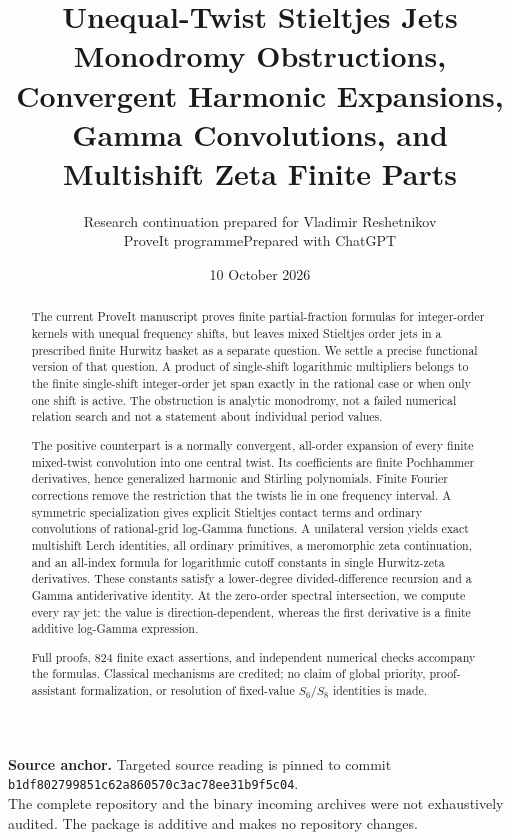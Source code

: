 \documentclass[11pt,a4paper]{article}
\title{\textbf{Unequal-Twist Stieltjes Jets}\\[5pt]
\large Monodromy Obstructions, Convergent Harmonic Expansions,\\
Gamma Convolutions, and Multishift Zeta Finite Parts}
\author{Research continuation prepared for Vladimir Reshetnikov\\
\small ProveIt programme\quad\textbullet\quad Prepared with ChatGPT}
\date{10 October 2026}
\numberwithin{equation}{section}
\theoremstyle{definition}\newtheorem{definition}[theorem]{Definition}
\theoremstyle{remark}\newtheorem{remark}[theorem]{Remark}
\newcommand{\pin}{\texttt{b1df802799851c62a860570c3ac78ee31b9f5c04}}
\begin{document}
\maketitle
\begin{abstract}
The current ProveIt manuscript proves finite partial-fraction formulas for
integer-order kernels with unequal frequency shifts, but leaves mixed
Stieltjes order jets in a prescribed finite Hurwitz basket as a separate
question. We settle a precise functional version of that question.
A product of single-shift logarithmic multipliers belongs to the finite
single-shift integer-order jet span exactly in the rational case or when
only one shift is active. The obstruction is analytic monodromy, not a
failed numerical relation search and not a statement about individual
period values.

The positive counterpart is a normally convergent, all-order expansion
of every finite mixed-twist convolution into one central twist. Its
coefficients are finite Pochhammer derivatives, hence generalized harmonic
and Stirling polynomials. Finite Fourier corrections remove the restriction
that the twists lie in one frequency interval. A symmetric specialization
gives explicit Stieltjes contact terms and ordinary convolutions of
rational-grid log-Gamma functions. A unilateral version yields exact
multishift Lerch identities, all ordinary primitives, a meromorphic zeta
continuation, and an all-index formula for logarithmic cutoff constants in
single Hurwitz-zeta derivatives. These constants satisfy a lower-degree
divided-difference recursion and a Gamma antiderivative identity. At the
zero-order spectral intersection, we compute every ray jet: the value is
direction-dependent, whereas the first derivative is a finite additive
log-Gamma expression.

Full proofs, 824 finite exact assertions, and independent numerical
checks accompany the formulas. Classical mechanisms are credited; no
claim of global priority, proof-assistant formalization, or resolution of
fixed-value $S_6/S_8$ identities is made.
\end{abstract}
\vspace{3pt}
\noindent\textbf{Source anchor.} Targeted source reading is pinned to commit\\
\pin.\\
The complete repository and the binary incoming archives were not
exhaustively audited. The package is additive and makes no repository changes.
\clearpage
\tableofcontents
\clearpage
\end{document}

